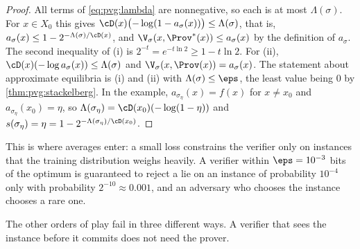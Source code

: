 \begin{refsection}
\begin{proof}
All terms of \eqref{eq:pvg:lambda} are nonnegative, so each is at most $\Lambda(\sigma)$. For $x\in X_0$ this gives $\cD(x)\bigl(-\log(1-a_\sigma(x))\bigr)\le\Lambda(\sigma)$, that is, $a_\sigma(x)\le1-2^{-\Lambda(\sigma)/\cD(x)}$, and $\V_\sigma(x,\Prov^*(x))\le a_\sigma(x)$ by the definition of $a_\sigma$. The second inequality of (i) is $2^{-t}=e^{-t\ln2}\ge1-t\ln2$. For (ii), $\cD(x)(-\log a_\sigma(x))\le\Lambda(\sigma)$ and $\V_\sigma(x,\Prov(x))=a_\sigma(x)$. The statement about approximate equilibria is (i) and (ii) with $\Lambda(\sigma)\le\eps$, the least value being $0$ by \cref{thm:pvg:stackelberg}. In the example, $a_{\sigma_\eta}(x)=f(x)$ for $x\ne x_0$ and $a_{\sigma_\eta}(x_0)=\eta$, so $\Lambda(\sigma_\eta)=\cD(x_0)(-\log(1-\eta))$ and $s(\sigma_\eta)=\eta=1-2^{-\Lambda(\sigma_\eta)/\cD(x_0)}$.
\end{proof}

This is where averages enter: a small loss constrains the verifier only on instances that the training distribution weighs heavily. A verifier within $\eps=10^{-3}$ bits of the optimum is guaranteed to reject a lie on an instance of probability $10^{-4}$ only with probability $2^{-10}\approx0.001$, and an adversary who chooses the instance chooses a rare one.

The other orders of play fail in three different ways. A verifier that sees the instance before it commits does not need the prover.



\end{refsection}
